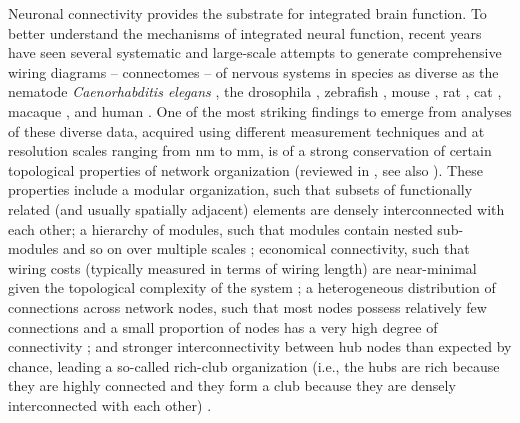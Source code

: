 \documentclass[10pt,letterpaper]{article}
\begin{document}
Neuronal connectivity provides the substrate for integrated brain function.
To better understand the mechanisms of integrated neural function, recent years have seen several systematic and large-scale attempts to generate comprehensive wiring diagrams -- connectomes -- of nervous systems in species as diverse as the nematode \emph{Caenorhabditis elegans} \cite{White:1986tx, Varshney2011}, the drosophila \cite{Chiang:2011, Shih:2015cu}, zebrafish \cite{Wanner:2016ea, Hildebrand:2017iu}, mouse \cite{Oh2014, Zingg:2014el}, rat \cite{bota2015}, cat \cite{scannell1995}, macaque \cite{Markov:2012wu, stephan2001}, and human \cite{Hagmann:2008gda, VanEssen2013}.
One of the most striking findings to emerge from analyses of these diverse data, acquired using different measurement techniques and at resolution scales ranging from nm to mm, is of a strong conservation of certain topological properties of network organization (reviewed in \cite{Bullmore:2009iv, Bullmore:2012vl, Sporns2011, VandenHeuvel2016, Schroter:2017eo}, see also \cite{fornito2016book}).
These properties include a modular organization, such that subsets of functionally related (and usually spatially adjacent) elements are densely interconnected with each other;
a hierarchy of modules, such that modules contain nested sub-modules and so on over multiple scales \cite{Meunier:2010hq, Bassett2010};
economical connectivity, such that wiring costs (typically measured in terms of wiring length) are near-minimal given the topological complexity of the system \cite{Betzel:2016jt, Bassett2010};
a heterogeneous distribution of connections across network nodes, such that most nodes possess relatively few connections and a small proportion of nodes has a very high degree of connectivity \cite{vandenHeuvel:2013ge, Varshney2011};
and stronger interconnectivity between hub nodes than expected by chance, leading a so-called rich-club organization (i.e., the hubs are rich because they are highly connected and they form a club because they are densely interconnected with each other) \cite{vandenHeuvel:2011he, ZamoraLopez:2010hy, deReus:2013cy,Towlson2013, Shih:2015cu}.
\end{document}
